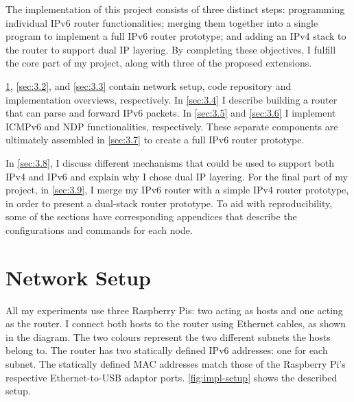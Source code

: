 



\label{sec:3}

The implementation of this project consists of three distinct steps: programming individual IPv6 router functionalities; merging them together into a single program to implement a full IPv6 router prototype; and adding an IPv4 stack to the router to support dual IP layering. By completing these objectives, I fulfill the core part of my project, along with three of the proposed extensions.

\cref{sec:3.1}, \cref{sec:3.2}, and \cref{sec:3.3} contain network setup, code repository and implementation overviews, respectively. In \cref{sec:3.4} I describe building a router that can parse and forward IPv6 packets. In \cref{sec:3.5} and \cref{sec:3.6} I implement ICMPv6 and NDP functionalities, respectively. These separate components are ultimately assembled in \cref{sec:3.7} to create a full IPv6 router prototype. 

In \cref{sec:3.8}, I discuss different mechanisms that could be used to support both IPv4 and IPv6 and explain why I chose dual IP layering. For the final part of my project, in \cref{sec:3.9}, I merge my IPv6 router with a simple IPv4 router prototype, in order to present a dual-stack router prototype. To aid with reproducibility, some of the sections have corresponding appendices that describe the configurations and commands for each node.



\section{Network Setup}
\label{sec:3.1}

All my experiments use three Raspberry Pis: two acting as hosts and one acting as the router. I connect both hosts to the router using Ethernet cables, as shown in the diagram. The two colours represent the two different subnets the hosts belong to. The router has two statically defined IPv6 addresses: one for each subnet. The statically defined MAC addresses match those of the Raspberry Pi’s respective Ethernet-to-USB adaptor ports. \cref{fig:impl-setup} shows the described setup.

